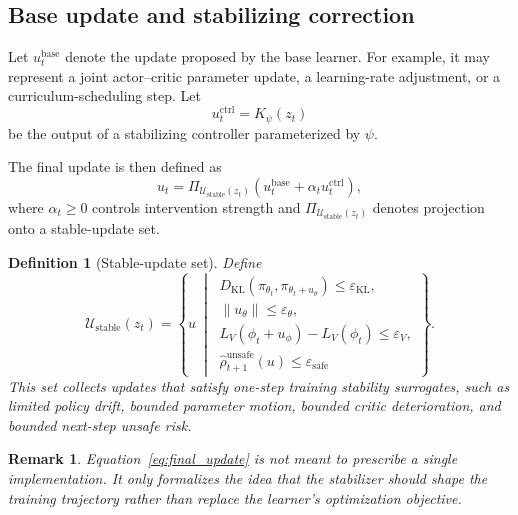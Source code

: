 \documentclass[11pt]{article}
\newtheorem{definition}{Definition}
\newtheorem{remark}{Remark}
\begin{document}
\subsection{Base update and stabilizing correction}

Let $u_t^{\mathrm{base}}$ denote the update proposed by the base learner. For example, it may represent a joint actor--critic parameter update, a learning-rate adjustment, or a curriculum-scheduling step. Let
\begin{equation}
u_t^{\mathrm{ctrl}} = K_{\psi}(z_t)
\end{equation}
be the output of a stabilizing controller parameterized by $\psi$.

The final update is then defined as
\begin{equation}
u_t =
\Pi_{\mathcal U_{\mathrm{stable}}(z_t)}
\left(
u_t^{\mathrm{base}} + \alpha_t u_t^{\mathrm{ctrl}}
\right),
\label{eq:final_update}
\end{equation}
where $\alpha_t \ge 0$ controls intervention strength and $\Pi_{\mathcal U_{\mathrm{stable}}(z_t)}$ denotes projection onto a stable-update set.

\begin{definition}[Stable-update set]
Define
\begin{equation}
\mathcal U_{\mathrm{stable}}(z_t)
=
\left\{
u \ \middle|\
\begin{array}{l}
D_{\mathrm{KL}}(\pi_{\theta_t},\pi_{\theta_t+u_\theta}) \le \varepsilon_{\mathrm{KL}},\\
\|u_\theta\| \le \varepsilon_{\theta},\\
L_V(\phi_t + u_\phi) - L_V(\phi_t) \le \varepsilon_V,\\
\widehat{\rho}^{\mathrm{unsafe}}_{t+1}(u) \le \varepsilon_{\mathrm{safe}}
\end{array}
\right\}.
\end{equation}
This set collects updates that satisfy one-step training stability surrogates, such as limited policy drift, bounded parameter motion, bounded critic deterioration, and bounded next-step unsafe risk.
\end{definition}

\begin{remark}
Equation~\eqref{eq:final_update} is not meant to prescribe a single implementation. It only formalizes the idea that the stabilizer should shape the \emph{training trajectory} rather than replace the learner's optimization objective.
\end{remark}
\end{document}
